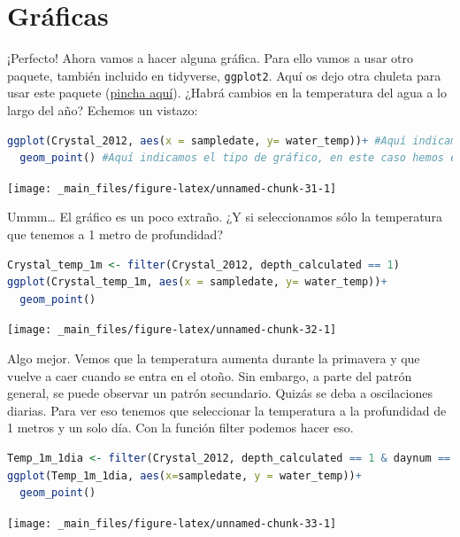 \documentclass[
]{book}
\newcommand{\passthrough}[1]{#1}
\begin{document}
\hypertarget{gruxe1ficas}{%
\section{Gráficas}\label{gruxe1ficas}}

¡Perfecto! Ahora vamos a hacer alguna gráfica. Para ello vamos a usar otro paquete, también incluido en tidyverse, \passthrough{\lstinline!ggplot2!}. Aquí os dejo otra chuleta para usar este paquete (\href{https://raw.githubusercontent.com/rstudio/cheatsheets/master/data-visualization-2.1.pdf}{pincha aquí}). ¿Habrá cambios en la temperatura del agua a lo largo del año? Echemos un vistazo:

\begin{lstlisting}[language=R]
ggplot(Crystal_2012, aes(x = sampledate, y= water_temp))+ #Aquí indicamos donde está la información que queremos representar (Crystal_2012) y que variables x e y
  geom_point() #Aquí indicamos el tipo de gráfico, en este caso hemos elegido puntos
\end{lstlisting}

\texttt{[image: \_main\_files/figure-latex/unnamed-chunk-31-1]}

Ummm\ldots{} El gráfico es un poco extraño. ¿Y si seleccionamos sólo la temperatura que tenemos a 1 metro de profundidad?

\begin{lstlisting}[language=R]
Crystal_temp_1m <- filter(Crystal_2012, depth_calculated == 1)
ggplot(Crystal_temp_1m, aes(x = sampledate, y= water_temp))+
  geom_point()
\end{lstlisting}

\texttt{[image: \_main\_files/figure-latex/unnamed-chunk-32-1]}

Algo mejor. Vemos que la temperatura aumenta durante la primavera y que vuelve a caer cuando se entra en el otoño. Sin embargo, a parte del patrón general, se puede observar un patrón secundario. Quizás se deba a oscilaciones diarias. Para ver eso tenemos que seleccionar la temperatura a la profundidad de 1 metros y un solo día. Con la función filter podemos hacer eso.

\begin{lstlisting}[language=R]
Temp_1m_1dia <- filter(Crystal_2012, depth_calculated == 1 & daynum == 260) #Yo he elegido el día 260 (16 de septiembre)
ggplot(Temp_1m_1dia, aes(x=sampledate, y = water_temp))+
  geom_point()
\end{lstlisting}

\texttt{[image: \_main\_files/figure-latex/unnamed-chunk-33-1]}
\end{document}
